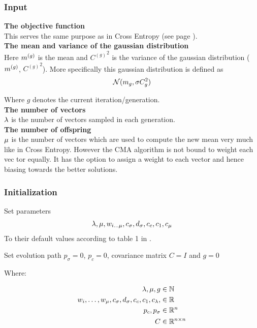 \subsubsection{Input}

\textbf{The objective function} \\
This serves the same purpose as in Cross Entropy (see page \pageref{CEObjective}).
\\

\textbf{The mean and variance of the gaussian distribution} \\
Here $m^{(g)}$ is the mean and  
${C^{(g)}}^{2}$ is the variance 
of the gaussian distribution ($m^{(g)}$,
${C^{(g)}}^2$). 
More specifically this gaussian distribution is defined as 
\begin{align}
\mathcal{N}(m_{g},\sigma C^2_{g})
\end{align}

Where $g$ denotes the current iteration/generation.\\


\textbf{The number of vectors}\\
$\lambda$ is the number of vectors sampled in each generation.
\\

\textbf{The number of offspring}\\
$\mu$ is the number of vectors which are used to compute 
the new mean very much like in Cross Entropy. However the CMA algorithm
is not bound to weight each vec tor equally. It has the option to assign 
a weight to each vector and hence biasing towards the better solutions.
\\


\subsubsection{Initialization}


Set parameters
\begin{align}
\lambda, \mu, w_{i \dots \mu}, c_{\sigma}, d_{\sigma}, c_c, c_1, c_{\mu}
\end{align}
To their default values according to table 1 in \citep{hansen2011}.

Set evolution path $p_{\sigma} = 0$, $p_{c} = 0$, covariance matrix $C = I$ and $g = 0$

Where:

\begin{align}
\lambda, \mu, g &\in \mathbb{N}\\
w_i,\dots,w_{\mu}, c_{\sigma}, d_{\sigma}, c_c, c_1, c_{\lambda}, &\in \mathbb{R}\\
p_{c}, p_{\sigma} &\in \mathbb{R}^{n}\\
C &\in \mathbb{R}^{n \times n}
\end{align}

